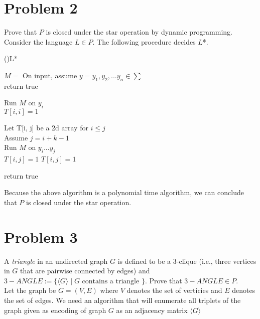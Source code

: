 \documentclass[11pt]{amsart}
\begin{document}
\section*{Problem 2}
Prove that $P$ is closed under the star operation by dynamic programming.\\
Consider the language $L \in P$. The following procedure decides $L$*.\\
\begin{algorithm}[H]
    \Fn(){L*}{
    \SetAlgoLined
    \SetNoFillComment
    \DontPrintSemicolon
        $M = $ On input, assume $y = y_1, y_2,...y_n \in \sum$\\
         {
            return true
        }

         {
             {
                Run $M$ on $y_i$\\
                $T[i, i] = 1$
            }
        }

        Let T[i, j] be a 2d array for $i \leq j$\\
         {
            Assume $j = i + k - 1$\\
             {
                Run $M$ on $y_i...y_j$\\
                $T[i, j] = 1$
            }
             {
                 {
                    $T[i, j] = 1$
                }
            }
        }

         {
            return true
        }
    }
    \end{algorithm}
\bigskip
Because the above algorithm is a polynomial time algorithm, we can conclude that $P$ is closed under the star operation.
\newpage

\section*{Problem 3}
A \emph{triangle} in an undirected graph $G $ is defined to be a 3-clique (i.e., three vertices in $G$ that are pairwise connected by edges)
and $3-ANGLE := \{ \langle G \rangle \mid G \mbox{ contains a triangle }\}$. Prove that $3-ANGLE \in P$. \\
\hspace*{15mm}Let the graph be $G = (V, E)$ where $V$ denotes the set of verticies and $E$ denotes the set of edges. We need an algorithm that will enumerate all triplets of the graph given as encoding of graph $G$ as an adjacency matrix $\langle G \rangle$\\
\end{document}
